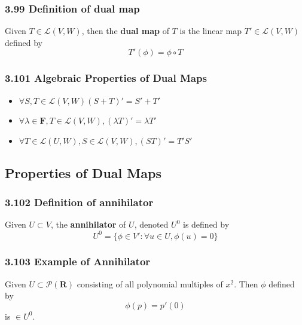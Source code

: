 \documentclass{article}
\begin{document}
\subsubsection*{3.99 Definition of dual map}
Given $T \in \mathcal{L}(V, W)$, then the \textbf{dual map} of $T$ is the linear map $T' \in \mathcal{L}(V, W)$ defined by
\begin{equation*}
    T'(\phi) = \phi \circ T
\end{equation*}
\subsubsection*{3.101 Algebraic Properties of Dual Maps}
\begin{itemize}
    \item $\forall S, T \in \mathcal{L}(V, W) (S+T)' = S' + T'$
    \item $\forall \lambda \in \mathbf{F}, T \in \mathcal{L}(V, W), (\lambda T)' = \lambda T'$
    \item $\forall T \in \mathcal{L}(U, W), S \in \mathcal{L}(V, W), (ST)' = T'S'$
\end{itemize}
\subsection*{Properties of Dual Maps}
\subsubsection*{3.102 Definition of annihilator}
Given $U \subset V$, the \textbf{annihilator} of $U$, denoted $U^0$ is defined by
\begin{equation*}
    U^0 = \{\phi \in V': \forall u \in U, \phi(u) = 0\}
\end{equation*}
\subsubsection*{3.103 Example of Annihilator}
Given $U \subset \mathcal{P}(\mathbf{R})$ consisting of all polynomial multiples of $x^2$. Then $\phi$ defined by
\begin{equation*}
    \phi(p) = p'(0)
\end{equation*}
is $\in U^0$.
\end{document}
